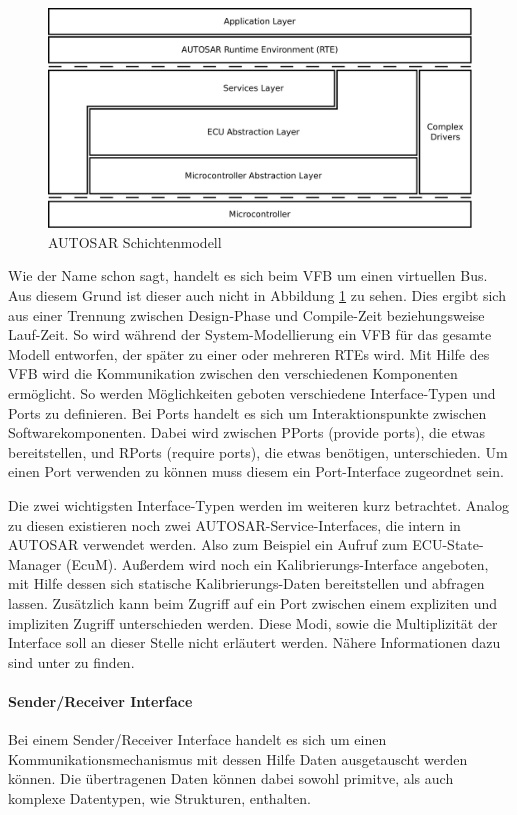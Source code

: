 \documentclass[
  a4paper,					    %
  twoside,
  DIV=calc,     				%
  bibliography=totoc,
  cleardoublepage=empty,
  ngerman,     					%
  final       					%
]{scrbook}
\begin{document}
\begin{figure}[ht]
    \centering
    \includegraphics[width=1\textwidth]{autosar_layer.png}
    \caption{AUTOSAR Schichtenmodell}
    \label{fig:autosar_layer}
\end{figure}

Wie der Name schon sagt, handelt es sich beim VFB um einen virtuellen Bus. Aus diesem Grund ist dieser auch nicht in Abbildung \ref{fig:autosar_layer} zu sehen. Dies ergibt sich aus einer Trennung zwischen Design-Phase und Compile-Zeit beziehungsweise Lauf-Zeit. So wird während der System-Modellierung ein VFB für das gesamte Modell entworfen, der später zu einer oder mehreren RTEs wird. Mit Hilfe des VFB wird die Kommunikation zwischen den verschiedenen Komponenten ermöglicht. So werden Möglichkeiten geboten verschiedene Interface-Typen und Ports zu definieren. Bei Ports handelt es sich um Interaktionspunkte zwischen Softwarekomponenten. Dabei wird zwischen PPorts (provide ports), die etwas bereitstellen, und RPorts (require ports), die etwas benötigen, unterschieden. Um einen Port verwenden zu können muss diesem ein Port-Interface zugeordnet sein.

Die zwei wichtigsten Interface-Typen werden im weiteren kurz betrachtet. Analog zu diesen existieren noch zwei AUTOSAR-Service-Interfaces, die intern in AUTOSAR verwendet werden. Also zum Beispiel ein Aufruf zum ECU-State-Manager (EcuM). Außerdem wird noch ein Kalibrierungs-Interface angeboten, mit Hilfe dessen sich statische Kalibrierungs-Daten bereitstellen und abfragen lassen. Zusätzlich kann beim Zugriff auf ein Port zwischen einem expliziten und impliziten Zugriff unterschieden werden. Diese Modi, sowie die Multiplizität der Interface soll an dieser Stelle nicht erläutert werden. Nähere Informationen dazu sind unter \cite[Seite 101 ff.]{SE_Autosar} zu finden.

\paragraph{Sender/Receiver Interface}
Bei einem Sender/Receiver Interface handelt es sich um einen Kommunikationsmechanismus mit dessen Hilfe Daten ausgetauscht werden können. Die übertragenen Daten können dabei sowohl primitve, als auch komplexe Datentypen, wie Strukturen, enthalten.
\end{document}
